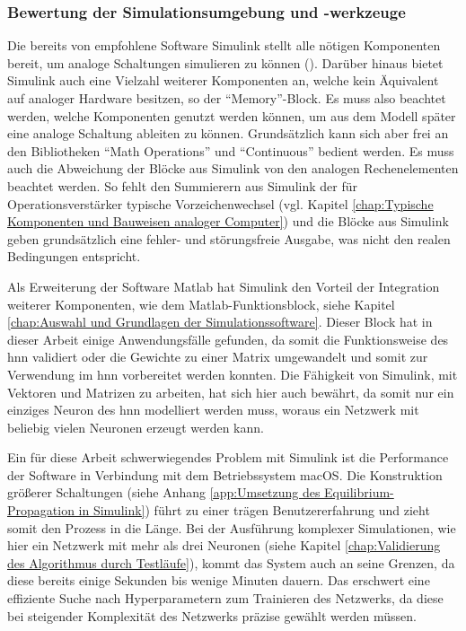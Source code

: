 \subsubsection{Bewertung der Simulationsumgebung und -werkzeuge}
\label{chap:Bewertung der Simulationsumgebung und -werkzeuge}

Die bereits von \citeauthor{Ulmann2022} empfohlene Software Simulink stellt alle nötigen Komponenten bereit, um analoge Schaltungen simulieren zu können (\cite[vgl. S. 240]{Ulmann2022}). Darüber hinaus bietet Simulink auch eine Vielzahl weiterer Komponenten an, welche kein Äquivalent auf analoger Hardware besitzen, so \zb der "`Memory"'-Block. Es muss also beachtet werden, welche Komponenten genutzt werden können, um aus dem Modell später eine analoge Schaltung ableiten zu können. Grundsätzlich kann sich aber frei an den Bibliotheken "`Math Operations"' und "`Continuous"' bedient werden. Es muss auch die Abweichung der Blöcke aus Simulink von den analogen Rechenelementen beachtet werden. So fehlt \zb den Summierern aus Simulink der für Operationsverstärker typische Vorzeichenwechsel (vgl. Kapitel \ref{chap:Typische Komponenten und Bauweisen analoger Computer}) und die Blöcke aus Simulink geben grundsätzlich eine fehler- und störungsfreie Ausgabe, was nicht den realen Bedingungen entspricht.

Als Erweiterung der Software Matlab hat Simulink den Vorteil der Integration weiterer Komponenten, wie dem Matlab-Funktionsblock, siehe Kapitel \ref{chap:Auswahl und Grundlagen der Simulationssoftware}. Dieser Block hat in dieser Arbeit einige Anwendungsfälle gefunden, da somit \zb die Funktionsweise des \ac{hnn} validiert oder die Gewichte zu einer Matrix umgewandelt und somit zur Verwendung im \ac{hnn} vorbereitet werden konnten. Die Fähigkeit von Simulink, mit Vektoren und Matrizen zu arbeiten, hat sich hier auch bewährt, da somit nur ein einziges Neuron des \ac{hnn} modelliert werden muss, woraus ein Netzwerk mit beliebig vielen Neuronen erzeugt werden kann.

Ein für diese Arbeit schwerwiegendes Problem mit Simulink ist die Performance der Software in Verbindung mit dem Betriebssystem macOS. Die Konstruktion größerer Schaltungen (siehe \zb Anhang \ref{app:Umsetzung des Equilibrium-Propagation in Simulink}) führt zu einer trägen Benutzererfahrung und zieht somit den Prozess in die Länge. Bei der Ausführung komplexer Simulationen, wie hier ein Netzwerk mit mehr als drei Neuronen (siehe Kapitel \ref{chap:Validierung des Algorithmus durch Testläufe}), kommt das System auch an seine Grenzen, da diese bereits einige Sekunden bis wenige Minuten dauern. Das erschwert \zb eine effiziente Suche nach Hyperparametern zum Trainieren des Netzwerks, da diese bei steigender Komplexität des Netzwerks präzise gewählt werden müssen.
